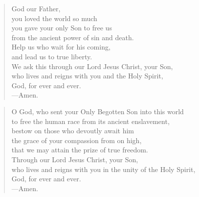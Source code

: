\prayer

\setlength{\vleftmargin}{\prayerleftmargini}

\begin{verse}
God our Father,\\
you loved the world so much\\
you gave your only Son to free us\\
from the ancient power of sin and death.\\
Help us who wait for his coming,\\
and lead us to true liberty.\\
We ask this through our Lord Jesus Christ, your Son,\\
who lives and reigns with you and the Holy Spirit,\\
God, for ever and ever.\\
{\color{red}---\thinspace}Amen.
\end{verse}


\begin{verse}
O God, who sent your Only Begotten Son into this world\\
to free the human race from its ancient enslavement,\\
bestow on those who devoutly await him\\
the grace of your compassion from on high,\\
that we may attain the prize of true freedom.\\
Through our Lord Jesus Christ, your Son,\\
who lives and reigns with you in the unity of the Holy Spirit,\\
God, for ever and ever.\\
{\color{red}---\thinspace}Amen.
\end{verse}

\setlength{\vleftmargin}{\defleftmargini}